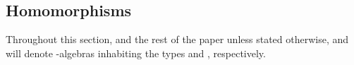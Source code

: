 \begin{code}
%
\>[29]\AgdaSymbol{=}\AgdaSpace{}%
\AgdaSpace{}%
\AgdaSpace{}%
\AgdaSpace{}%
\AgdaSpace{}%
%
\>[42]%
\>[50]\AgdaSymbol{(}\AgdaSpace{}%
\AgdaOperator{\AgdaFunction{𝔻[}}\AgdaSpace{}%
\AgdaSpace{}%
\AgdaSpace{}%
\AgdaOperator{\AgdaFunction{]}}\AgdaSymbol{)(}\AgdaSpace{}%
\AgdaSymbol{)(}\AgdaSpace{}%
\AgdaSymbol{)}\AgdaSpace{}%
\AgdaSymbol{\}\}}\<%
\\
%
\>[1]\AgdaSpace{}%
\AgdaSymbol{(}\AgdaSpace{}%
\AgdaSymbol{)}\AgdaSpace{}%
\AgdaSpace{}%
\AgdaSymbol{(}\AgdaSpace{}%
\AgdaOperator{\AgdaInductiveConstructor{,}}\AgdaSpace{}%
\AgdaSymbol{)}\AgdaSpace{}%
\AgdaSymbol{=}\AgdaSpace{}%
\AgdaSpace{}%
\AgdaSpace{}%
\AgdaSpace{}%
\AgdaSymbol{(}\AgdaSpace{}%
\AgdaSpace{}%
\AgdaSymbol{(}\AgdaSpace{}%
\AgdaSymbol{))}\AgdaSpace{}%
\AgdaSymbol{(}\AgdaSpace{}%
\AgdaSpace{}%
\AgdaSymbol{)}\<%
\\
%
\>[1]\AgdaSpace{}%
\AgdaSymbol{(}\AgdaSpace{}%
\AgdaSymbol{(}\AgdaSpace{}%
\AgdaSymbol{))}\AgdaSpace{}%
\AgdaSymbol{(}\AgdaSpace{}%
\AgdaOperator{\AgdaInductiveConstructor{,}}\AgdaSpace{}%
\AgdaSpace{}%
\AgdaSymbol{)}\AgdaSpace{}%
\AgdaSymbol{=}\AgdaSpace{}%
\AgdaSpace{}%
\AgdaSpace{}%
\AgdaSpace{}%
\AgdaSpace{}%
\AgdaSymbol{(}\AgdaSpace{}%
\AgdaSymbol{(}\AgdaSpace{}%
\AgdaSymbol{))}\AgdaSpace{}%
\AgdaSymbol{(}\AgdaSpace{}%
\AgdaOperator{\AgdaInductiveConstructor{,}}\AgdaSpace{}%
\AgdaSpace{}%
\AgdaSpace{}%
\AgdaSpace{}%
\AgdaSymbol{)}\<%
\end{code}
\fi




\subsection{Homomorphisms}\label{homomorphisms}
Throughout this section, and the rest of the paper unless stated otherwise,  and 
will denote -algebras inhabiting the types    and
  , respectively.

